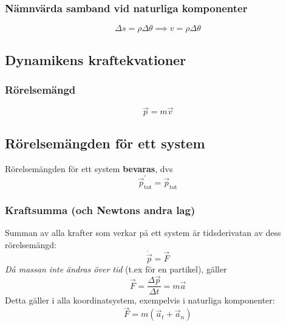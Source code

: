 \documentclass{article}
\newenvironment{ankiflashcard}[1]{}{}
\begin{document}
\begin{paracol}{2}
\subsubsection{Nämnvärda samband vid naturliga komponenter}

\begin{ankiflashcard}{Hur definieras hastighet i naturliga kompontenter? (trevligt trick)}
    $$
    \Delta s = \rho \Delta \theta
    \implies v = \rho \Delta \theta   $$
\end{ankiflashcard}
\subsection{Dynamikens kraftekvationer}

\begin{ankiflashcard}{Definiera rörelsemängd}
    
\subsubsection{Rörelsemängd}
$$\vec p = m \vec v$$
\end{ankiflashcard}

\begin{ankiflashcard}{Vad är sant om rörelsemängdslagen för ett system?}
\subsection{Rörelsemängden för ett system}
Rörelsemängden för ett system \textbf{bevaras}, dvs
$$\vec p_{\text{tot}}^{\prime} = \vec p_{\text{tot}}$$
\end{ankiflashcard}


\begin{ankiflashcard}{Forumlera Newtons andra lag}
\subsubsection{Kraftsumma (och Newtons andra lag)}
Summan av alla krafter som verkar på ett system är tidsderivatan av dess rörelsemängd:
$$\dot{\vec p} = \vec F$$
\textit{Då massan inte ändras över tid} (t.ex för en partikel), gäller
$$\vec F= \frac{\Delta \vec p}{\Delta t} = m\vec a$$
Detta gäller i alla koordinatsystem, exempelvis i naturliga komponenter:
$$\vec F = m(\vec a_t + \vec a_n)$$
\end{ankiflashcard}



\end{paracol}
\end{document}
